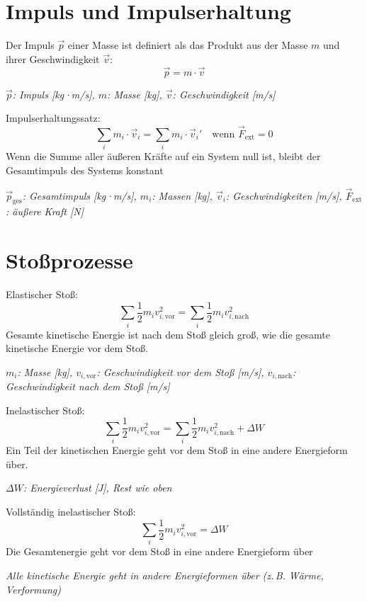 \documentclass[a4paper,10pt]{article}
\newenvironment{displayformula}
{
	\begin{framed}
		\color{formulaColor}
	}
	{\end{framed}}
\newcommand{\formulalegend}[1]{%
	\par\vspace{0.5ex}%
	{{\color{legendColor}\RaggedRight\small\textit{#1}}}%
	\par\vspace{1.5ex}%
}
\begin{document}
\section{Impuls und Impulserhaltung}

\begin{displayformula}
	Der Impuls \( \vec{p} \) einer Masse ist definiert als das Produkt aus der Masse \( m \) und ihrer Geschwindigkeit \( \vec{v} \):
	\[
	\vec{p} = m \cdot \vec{v}
	\]
\end{displayformula}
\formulalegend{
	\( \vec{p} \): Impuls [kg·m/s], \( m \): Masse [kg], \( \vec{v} \): Geschwindigkeit [m/s]
}

\begin{displayformula}
	Impulserhaltungssatz:
	\[
	 \sum_i m_i \cdot \vec{v}_i = \sum_i m_i \cdot \vec{v}_i ' \quad \text{wenn } \vec{F}_{\text{ext}} = 0
	\]
	Wenn die Summe aller äußeren Kräfte auf ein System null ist, bleibt der Gesamtimpuls des Systems konstant
\end{displayformula}
\formulalegend{
	\( \vec{p}_{\text{ges}} \): Gesamtimpuls [kg·m/s], \( m_i \): Massen [kg], \( \vec{v}_i \): Geschwindigkeiten [m/s], \( \vec{F}_{\text{ext}} \): äußere Kraft [N]
}

\section{Stoßprozesse}

\begin{displayformula}
	Elastischer Stoß:
	\[
	\sum_i \frac{1}{2} m_i v_{i,\text{vor}}^2 = \sum_i \frac{1}{2} m_i v_{i,\text{nach}}^2
	\]
	Gesamte kinetische Energie ist nach dem Stoß gleich groß, wie die gesamte kinetische Energie vor dem Stoß.
\end{displayformula}
\formulalegend{
	\( m_i \): Masse [kg], \( v_{i,\text{vor}} \): Geschwindigkeit vor dem Stoß [m/s], \( v_{i,\text{nach}} \): Geschwindigkeit nach dem Stoß [m/s]
}

\begin{displayformula}
	Inelastischer Stoß:
	\[
	\sum_i \frac{1}{2} m_i v_{i,\text{vor}}^2 = \sum_i \frac{1}{2} m_i v_{i,\text{nach}}^2 + \Delta W
	\]
	Ein Teil der kinetischen Energie geht vor dem Stoß in eine andere Energieform über.
\end{displayformula}
\formulalegend{
	\( \Delta W \): Energieverlust [J], Rest wie oben
}
\begin{displayformula}
	Vollständig inelastischer Stoß:
	\[
	\sum_i \frac{1}{2} m_i v_{i,\text{vor}}^2 = \Delta W
	\]
	Die Gesamtenergie geht vor dem Stoß in eine andere Energieform über
\end{displayformula}
\formulalegend{
	Alle kinetische Energie geht in andere Energieformen über (z.\,B. Wärme, Verformung)
}
\end{document}

